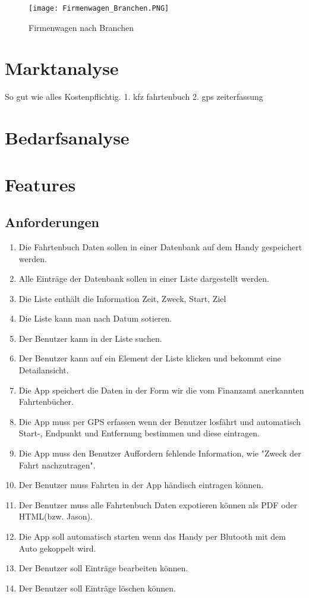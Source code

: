 \documentclass{article}
\begin{document}
\begin{figure}[h]
  \centering
     \texttt{[image: Firmenwagen\_Branchen.PNG]}
  \caption{Firmenwagen nach Branchen}
  \label{fig:Bild1}
\end{figure}


\section{Marktanalyse}
So gut wie alles Kostenpflichtig.
1. kfz fahrtenbuch
2. gps zeiterfassung

\section{Bedarfsanalyse}

\section{Features}
\subsection{Anforderungen}
	\begin{enumerate}
	\item Die Fahrtenbuch Daten sollen in einer Datenbank auf dem Handy gespeichert werden.
	\item Alle Einträge der Datenbank sollen in einer Liste dargestellt werden.
	\item Die Liste enthält die Information Zeit, Zweck, Start, Ziel
	\item Die Liste kann man nach Datum sotieren.
	\item Der Benutzer kann in der Liste suchen.
	\item Der Benutzer kann auf ein Element der Liste klicken und bekommt eine Detailansicht.
	\item Die App speichert die Daten in der Form wir die vom Finanzamt anerkannten Fahrtenbücher.
	\item Die App muss per GPS erfassen wenn der Benutzer losfährt und automatisch Start-, Endpunkt und Entfernung bestimmen und diese eintragen.
	\item Die App muss den Benutzer Auffordern fehlende Information, wie "Zweck der Fahrt nachzutragen".
	\item Der Benutzer muss Fahrten in der App händisch eintragen können.
	\item Der Benutzer muss alle Fahrtenbuch Daten expotieren können als PDF oder HTML(bzw. Jason).
	\item Die App soll automatisch starten wenn das Handy per Blutooth mit dem Auto gekoppelt wird.
	\item Der Benutzer soll Einträge bearbeiten können.
	\item Der Benutzer soll Einträge löschen können.
	\end{enumerate}
\end{document}
